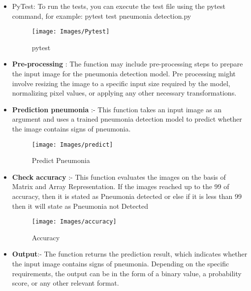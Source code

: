 \begin{itemize}
	\item PyTest:
	To run the tests, you can execute the test file using the pytest command, \newline 
	for example: pytest test pneumonia detection.py
	
	\begin{figure}
		\centering
		\texttt{[image: Images/Pytest]}
		\caption{pytest}
		\label{fig:pytest}
	\end{figure}
	
	
	\item \textbf{Pre-processing} :
	The function may include pre-processing steps to prepare the input image for the pneumonia detection model. Pre processing might involve resizing the image to a specific input size required by the model, normalizing pixel values, or applying any other necessary transformations.
	
	\item\textbf{Prediction pneumonia} :- This function takes an input image as an argument and uses a trained pneumonia detection model to predict whether the image contains signs of pneumonia.
	
	\begin{figure}
		\centering
		\texttt{[image: Images/predict]}
		\caption{Predict Pneumonia}
		\label{fig:predict}
	\end{figure}
	
	
	\item \textbf{Check accuracy}  :- This function evaluates the images on the basis of Matrix  and Array Representation. If the images reached up to the 99 of accuracy, then it is stated as Pneumonia detected or else if it is less than 99 then it will state as Pneumonia not Detected
	
	
	\begin{figure}
		\centering
		\texttt{[image: Images/accuracy]}
		\caption{Accuracy}
		\label{fig:accuracy}
	\end{figure}
	
	\item \textbf {Output}:-
	The function returns the prediction result, which indicates whether the input image contains signs of pneumonia. Depending on the specific requirements, the output can be in the form of a binary value, a probability score, or any other relevant format.
	
\end{itemize}


